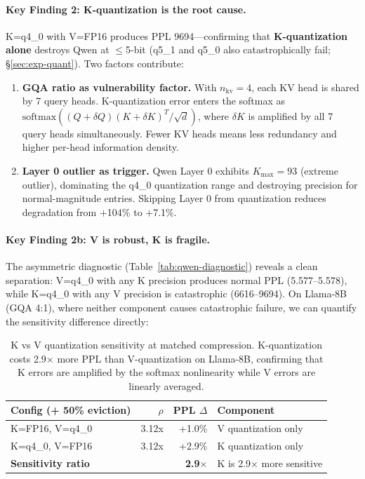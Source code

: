 \paragraph{Key Finding 2: K-quantization is the root cause.}
K=q4\_0 with V=FP16 produces PPL 9694---confirming that \textbf{K-quantization alone} destroys Qwen at $\leq$5-bit (q5\_1 and q5\_0 also catastrophically fail; \S\ref{sec:exp-quant}). Two factors contribute:

\begin{enumerate}
    \item \textbf{GQA ratio as vulnerability factor.} With $n_\text{kv}=4$, each KV head is shared by 7 query heads. K-quantization error enters the softmax as $\text{softmax}((Q + \delta Q)(K + \delta K)^T / \sqrt{d})$, where $\delta K$ is amplified by all 7 query heads simultaneously. Fewer KV heads means less redundancy and higher per-head information density.
    \item \textbf{Layer 0 outlier as trigger.} Qwen Layer 0 exhibits $K_\text{max}=93$ (extreme outlier), dominating the q4\_0 quantization range and destroying precision for normal-magnitude entries. Skipping Layer 0 from quantization reduces degradation from $+$104\% to $+$7.1\%.
\end{enumerate}

\paragraph{Key Finding 2b: V is robust, K is fragile.}
The asymmetric diagnostic (Table~\ref{tab:qwen-diagnostic}) reveals a clean separation: V=q4\_0 with any K precision produces normal PPL (5.577--5.578), while K=q4\_0 with any V precision is catastrophic (6616--9694). On Llama-8B (GQA 4:1), where neither component causes catastrophic failure, we can quantify the sensitivity difference directly:

\begin{table}[h]
\centering
\begin{tabular}{lrrl}
\toprule
\textbf{Config (+ 50\% eviction)} & \textbf{$\rho$} & \textbf{PPL $\Delta$} & \textbf{Component} \\
\midrule
K=FP16, V=q4\_0 & 3.12x & +1.0\% & V quantization only \\
K=q4\_0, V=FP16 & 3.12x & +2.9\% & K quantization only \\
\midrule
\multicolumn{2}{l}{\textbf{Sensitivity ratio}} & \textbf{2.9$\times$} & K is 2.9$\times$ more sensitive \\
\bottomrule
\end{tabular}
\caption{K vs V quantization sensitivity at matched compression. K-quantization costs 2.9$\times$ more PPL than V-quantization on Llama-8B, confirming that K errors are amplified by the softmax nonlinearity while V errors are linearly averaged.}
\label{tab:kv-sensitivity}
\end{table}

